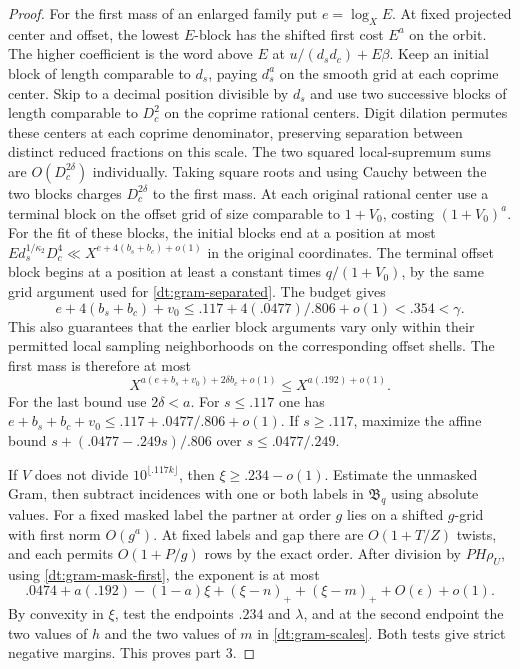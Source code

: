 \documentclass[11pt,a4paper]{article}
\theoremstyle{paperplain}
\numberwithin{equation}{section}
\begin{document}
\begin{proof}
For the first mass of an enlarged family put \(e=\log_XE\).
At fixed projected center and offset, the lowest \(E\)-block
has the shifted first cost \(E^a\) on the orbit. The higher
coefficient is the word above \(E\) at
\(u/(d_s d_c)+E\beta\). Keep an initial block of length
comparable to \(d_s\), paying \(d_s^a\) on the smooth
grid at each coprime center. Skip to a decimal position
divisible by \(d_s\) and use two successive blocks of length
comparable to \(D_c^2\) on the coprime rational centers.
Digit dilation permutes these centers at each coprime
denominator, preserving separation between distinct reduced
fractions on this scale. The two squared local-supremum sums
are \(O(D_c^{2\delta})\) individually. Taking square roots
and using Cauchy between the two blocks charges
\(D_c^{2\delta}\) to the first mass. At each original rational
center use a terminal block on the offset grid of size
comparable to \(1+V_0\), costing \((1+V_0)^a\).
For the fit of these blocks, the initial blocks end at a
position at most \(E d_s^{1/\kappa_2}D_c^4\ll
X^{e+4(b_s+b_c)+o(1)}\) in the original coordinates.
The terminal offset block begins at a position at least
a constant times \(q/(1+V_0)\), by the same grid argument
used for \eqref{dt:gram-separated}. The budget gives
\[
 e+4(b_s+b_c)+v_0
             \le .117+4(.0477)/.806+o(1)<.354<\gamma .
\]
This also guarantees that the earlier block arguments vary
only within their permitted local sampling neighborhoods
on the corresponding offset shells. The first mass is
therefore at most
\begin{equation}
  X^{a(e+b_s+v_0)+2\delta b_c+o(1)}
                                     \le X^{a(.192)+o(1)} .
 \label{dt:gram-mask-first}
\end{equation}
For the last bound use \(2\delta<a\). For \(s\le.117\)
one has \(e+b_s+b_c+v_0\le .117+.0477/.806+o(1)\).
If \(s\ge.117\), maximize the affine bound
\(s+(.0477-.249s)/.806\) over \(s\le.0477/.249\).

If \(V\) does not divide \(10^{\lfloor.117k\rfloor}\),
then \(\xi\ge.234-o(1)\). Estimate the unmasked Gram,
then subtract incidences with one or both labels in
\(\mathfrak B_q\) using absolute values. For a fixed
masked label the partner at order \(g\) lies on a
shifted \(g\)-grid with first norm \(O(g^a)\).
At fixed labels and gap there are \(O(1+T/Z)\) twists,
and each permits \(O(1+P/g)\) rows by the exact order.
After division by \(PH\rho_U\), using
\eqref{dt:gram-mask-first}, the exponent is at most
\[
 .0474+a(.192)-(1-a)\xi+(\xi-n)_++(\xi-m)_+
                                      +O(\epsilon)+o(1).
\]
By convexity in \(\xi\), test the endpoints \(.234\) and
\(\lambda\), and at the second endpoint the two values
of \(h\) and the two values of \(m\) in
\eqref{dt:gram-scales}. Both tests give strict negative
margins. This proves part 3.
\end{proof}
\end{document}

